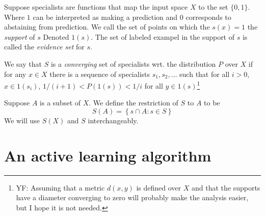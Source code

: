\documentclass{article}
\begin{document}
Suppose specialists are functions that map the input space $X$ to the
set $\{0,1\}$. Where $1$ can be interpreted as making a prediction and
$0$ corresponds to abstaining from prediction. We call the set of
points on which the $s(x)=1$ the {\em support} of $s$ Denoted
$1(s)$. The set of labeled exampel in the support of $s$ is called the
{\em evidence set} for $s$.

We say that $S$ is a {\em converging} set of specialists wrt. the
distribution $P$ over $X$ if for any $x \in X$ there is a
sequence of specialists $s_1,s_2,\ldots$ such that for all $i>0$,
$x\in 1(s_i)$, $1/(i+1) < P(1(s))< 1/i$  for all $y \in
1(s)$\footnote{YF: Assuming that a metric $d(x,y)$ is defined over $X$ and
  that the supports have a diameter converging to zero will probably
  make the analysis easier, but I hope it is not needed.}

Suppose $A$ is a subset of $X$. We define the restriction of $S$ to
$A$ to be
\[
S(A) = \left\{s \cap A : s \in S \right\}
\]
We will use $S(X)$ and $S$ interchangeably.

\section{An active learning algorithm}
\end{document}
